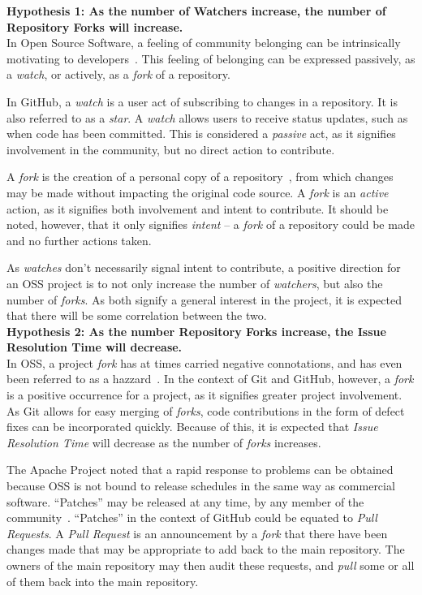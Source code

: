 \documentclass{proc}
\begin{document}
\noindent \textbf{Hypothesis 1: As the number of Watchers increase, the number of Repository Forks will increase.}\\
In Open Source Software, a feeling of community belonging can be intrinsically motivating to developers~\cite{lakhani2003hackers}. This feeling of belonging can be expressed passively, as a \emph{watch}, or actively, as a \emph{fork} of a repository. 

In GitHub, a \emph{watch} is a user act of subscribing to changes in a repository. It is also referred to as a \emph{star}. A \emph{watch} allows users to receive status updates, such as when code has been committed. This is considered a \emph{passive} act, as it signifies involvement in the community, but no direct action to contribute.

A \emph{fork} is the creation of a personal copy of a repository~\cite{dabbish2012social}, from which changes may be made without impacting the original code source. A \emph{fork} is an \emph{active} action, as it signifies both involvement and intent to contribute. It should be noted, however, that it only signifies \emph{intent} -- a \emph{fork} of a repository could be made and no further actions taken.

As \emph{watches} don't necessarily signal intent to contribute, a positive direction for an OSS project is to not only increase the number of \emph{watchers}, but also the number of \emph{forks}. As both signify a general interest in the project, it is expected that there will be some correlation between the two.\\

\noindent \textbf{Hypothesis 2: As the number Repository Forks increase, the Issue Resolution Time will decrease.}\\
In OSS, a project \emph{fork} has at times carried negative connotations, and has even been referred to as a hazzard~\cite{kogut2001open}. In the context of Git and GitHub, however, a \emph{fork} is a positive occurrence for a project, as it signifies greater project involvement. As Git allows for easy merging of \emph{forks}, code contributions in the form of defect fixes can be incorporated quickly. Because of this, it is expected that \emph{Issue Resolution Time} will decrease as the number of \emph{forks} increases.

The Apache Project noted that a rapid response to problems can be obtained because OSS is not bound to release schedules in the same way as commercial software. ``Patches'' may be released at any time, by any member of the community~\cite{mockus2000case}. ``Patches'' in the context of GitHub could be equated to \emph{Pull Requests}. A \emph{Pull Request} is an announcement by a \emph{fork} that there have been changes made that may be appropriate to add back to the main repository. The owners of the main repository may then audit these requests, and \emph{pull} some or all of them back into the main repository.
\end{document}
